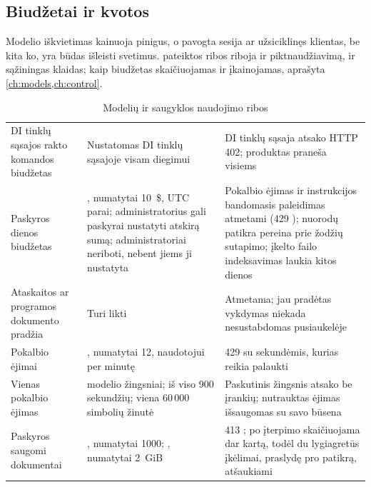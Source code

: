\subsection{Biudžetai ir kvotos}\label{sec:security:ai:limits}

Modelio iškvietimas kainuoja pinigus, o pavogta sesija ar užsiciklinęs klientas, be kita ko,
yra būdas išleisti svetimus.  pateiktos ribos riboja ir
piktnaudžiavimą, ir sąžiningas klaidas; kaip biudžetas skaičiuojamas ir įkainojamas, aprašyta
\cref{ch:models,ch:control}.

\begin{table}[H]
\caption{Modelių ir saugyklos naudojimo ribos}\label{tab:security:limits}
\begin{tabularx}{\textwidth}{@{}L{40mm}L{46mm}Y@{}}
\toprule
{} &  &  \\
\midrule
DI tinklų sąsajos rakto komandos biudžetas & Nustatomas DI tinklų sąsajoje visam diegimui & DI tinklų sąsaja atsako HTTP 402; produktas praneša  visiems \\
Paskyros dienos biudžetas & , numatytai 10~\$, UTC parai; administratorius gali paskyrai nustatyti atskirą sumą; administratoriai neriboti, nebent jiems ji nustatyta & Pokalbio ėjimas ir instrukcijos bandomasis paleidimas atmetami (429 ); nuorodų patikra pereina prie žodžių sutapimo; įkelto failo indeksavimas laukia kitos dienos \\
Ataskaitos ar programos dokumento pradžia & Turi likti  \code{=}  & Atmetama; jau pradėtas vykdymas niekada nesustabdomas pusiaukelėje \\
Pokalbio ėjimai & , numatytai 12, naudotojui per minutę & 429  su sekundėmis, kurias reikia palaukti \\
Vienas pokalbio ėjimas &  \code{=}  modelio žingsniai; iš viso 900 sekundžių; viena 60\,000 simbolių žinutė & Paskutinis žingsnis atsako be įrankių; nutrauktas ėjimas išsaugomas su savo būsena \\
Paskyros saugomi dokumentai & , numatytai 1000; , numatytai 2~GiB & 413 ; po įterpimo skaičiuojama dar kartą, todėl du lygiagretūs įkėlimai, praslydę pro patikrą, atšaukiami \\
\bottomrule
\end{tabularx}
\end{table}

